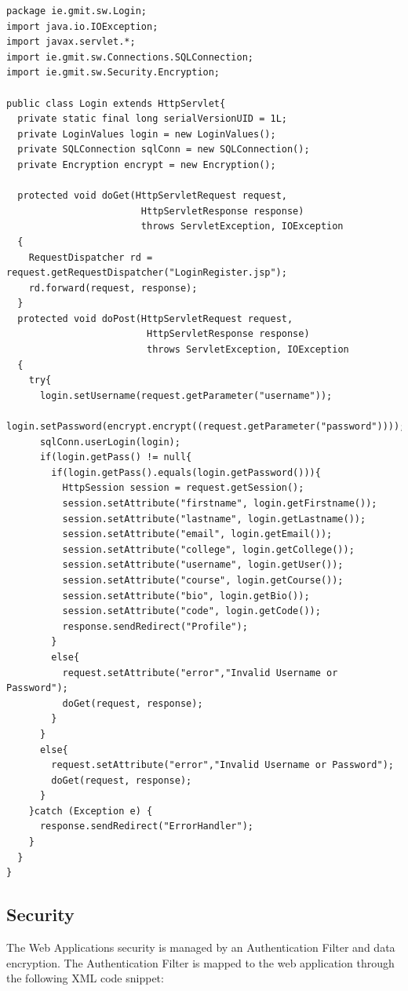 \begin{verbatim}
package ie.gmit.sw.Login;
import java.io.IOException;
import javax.servlet.*;
import ie.gmit.sw.Connections.SQLConnection;
import ie.gmit.sw.Security.Encryption;

public class Login extends HttpServlet{
  private static final long serialVersionUID = 1L;
  private LoginValues login = new LoginValues();
  private SQLConnection sqlConn = new SQLConnection();
  private Encryption encrypt = new Encryption();
  
  protected void doGet(HttpServletRequest request, 
                        HttpServletResponse response) 
                        throws ServletException, IOException
  {
    RequestDispatcher rd = request.getRequestDispatcher("LoginRegister.jsp");
    rd.forward(request, response);
  }
  protected void doPost(HttpServletRequest request,
                         HttpServletResponse response)
                         throws ServletException, IOException 
  {
    try{
      login.setUsername(request.getParameter("username"));
      login.setPassword(encrypt.encrypt((request.getParameter("password"))));
      sqlConn.userLogin(login);
      if(login.getPass() != null{
        if(login.getPass().equals(login.getPassword())){
          HttpSession session = request.getSession();
          session.setAttribute("firstname", login.getFirstname());
          session.setAttribute("lastname", login.getLastname());
          session.setAttribute("email", login.getEmail());
          session.setAttribute("college", login.getCollege());
          session.setAttribute("username", login.getUser());
          session.setAttribute("course", login.getCourse());
          session.setAttribute("bio", login.getBio());
          session.setAttribute("code", login.getCode());
          response.sendRedirect("Profile");
        }
        else{
          request.setAttribute("error","Invalid Username or Password");
          doGet(request, response);
        }
      }
      else{
        request.setAttribute("error","Invalid Username or Password");
        doGet(request, response);
      }
    }catch (Exception e) {
      response.sendRedirect("ErrorHandler");
    }
  }
}
\end{verbatim}

\subsection{Security}
The Web Applications security is managed by an Authentication Filter and data encryption. The Authentication Filter is mapped to the web application through the following XML code snippet:

